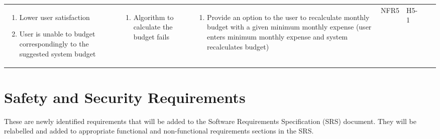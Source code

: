 \documentclass{article}
\begin{document}
\begin{landscape}
\begin{longtable}{|p{3cm}|p{4cm}|p{5cm}|p{5cm}|p{5cm}|p{1cm}|p{0.75cm}|}
    \begin{enumerate}[label=(\alph*), leftmargin=0.5cm]
        \item Lower user satisfaction
        \item User is unable to budget correspondingly to the suggested system budget 
    \end{enumerate} &
    \begin{enumerate}[label=(\alph*), leftmargin=0.5cm]
        \item Algorithm to calculate the budget fails 
    \end{enumerate} &
    \begin{enumerate}[label=(\alph*), leftmargin=0.5cm]
        \item Provide an option to the user to recalculate monthly budget with a given minimum monthly expense (user enters minimum monthly expense and system recalculates budget) 
    \end{enumerate} &
    NFR5 &
    H5-1\\
\end{longtable}
    \newpage{}
\end{landscape}
\restoregeometry

\section{Safety and Security Requirements}

These are newly identified requirements that will be added to the Software
Requirements Specification (SRS) document. They will be relabelled and added to
appropriate functional and non-functional requirements sections in the SRS.
\end{document}
